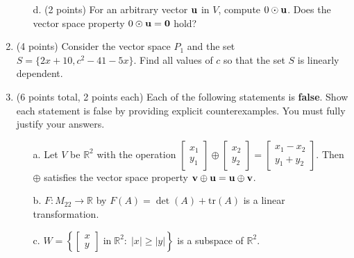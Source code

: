 \documentclass[12pt]{extarticle}
\begin{document}
\begin{enumerate}
\begin{itemize}
\vfill 



\item[d.] (2 points) For an arbitrary vector ${\mathbf{u}}$ in $V$, compute $0\odot {\mathbf{u}}$. Does the vector space property $0\odot {\mathbf{u}}=\mathbf{0}$ hold? %

\vspace{1.25in}

\end{itemize}


\newpage

\item (4 points) Consider the vector space $P_1$ and the set $S=\{2x+10,c^2-41-5x\}$. Find all values of $c$ so that the set $S$
 is linearly dependent.

\newpage


    \item (6 points total, 2 points each)  Each of the following statements is \textbf{false}. Show each statement is false by providing explicit counterexamples. You must fully justify your answers.


    \begin{itemize}
\item[a.]  Let $V$ be $\mathbb{R}^2$ with the operation $\begin{bmatrix} x_1\\ y_1\end{bmatrix}\oplus \begin{bmatrix} x_2\\ y_2\end{bmatrix} = \begin{bmatrix} x_1-x_2\\ y_1+y_2\end{bmatrix}$.  Then $\oplus$ satisfies the vector space property ${\mathbf{v}}\oplus {\mathbf{u}}={\mathbf{u}}\oplus {\mathbf{v}}$.

\vfill

\item[b.] $F:M_{22}\to \mathbb{R}$ by $F(A)=\det(A)+\text{tr}(A)$ is a linear transformation.

\vfill

\item[c.] $W=\left\{\begin{bmatrix} x \\ y\end{bmatrix} \;\text{in} \;\mathbb{R}^2 :\; |x|\geq |y|\right\}$ is a subspace of $\mathbb{R}^2$.

\vfill
    \end{itemize}
    

\end{enumerate}
\end{document}
